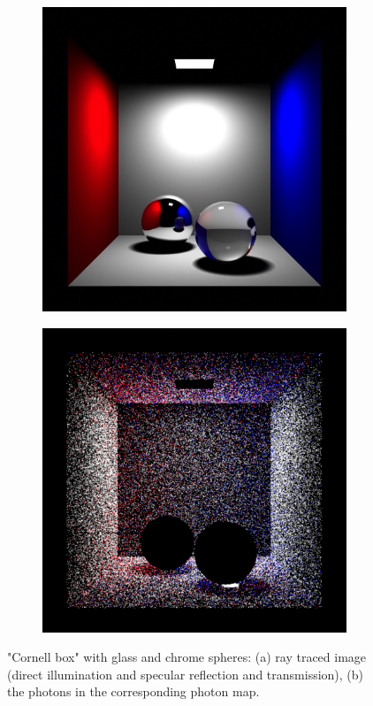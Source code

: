 \begin{figure}\label{f:photon-storing}
\begin{center}
	\begin{subfigure}[b]{0.492\textwidth}
		\includegraphics[width=1.0\textwidth]{graphics/pm/pm-2-1}
	\end{subfigure}
	\begin{subfigure}[b]{0.492\textwidth}
		\includegraphics[width=1.0\textwidth]{graphics/pm/pm-2-2}
	\end{subfigure}
\end{center}
\caption{"Cornell box" with glass and chrome spheres: (a) ray traced image (direct illumination and specular reflection and transmission), (b) the photons in the corresponding photon map.}
\end{figure}

